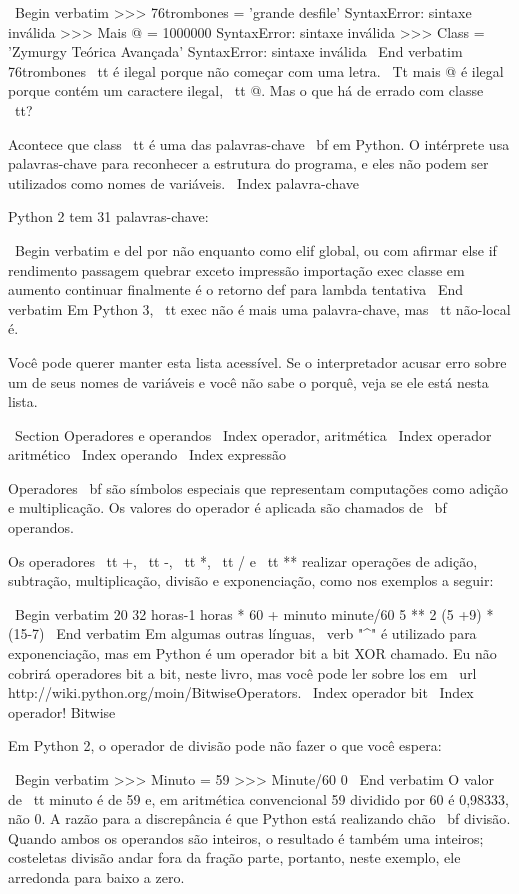 \documentclass[10pt]{book}
\begin{document}
\begin {itemize}
{\ Begin {verbatim}
>>> 76trombones = 'grande desfile'
SyntaxError: sintaxe inválida
>>> Mais @ = 1000000
SyntaxError: sintaxe inválida
>>> Class = 'Zymurgy Teórica Avançada'
SyntaxError: sintaxe inválida
\ End {verbatim}
%
{76trombones \ tt} é ilegal porque não começar com uma letra.
{\ Tt mais @} é ilegal porque contém um caractere ilegal, {\ tt
@}. Mas o que há de errado com classe {\ tt}?

Acontece que {class \ tt} é uma das palavras-chave {\ bf} em Python. O
intérprete usa palavras-chave para reconhecer a estrutura do programa,
e eles não podem ser utilizados como nomes de variáveis.
\ Index {palavra-chave}

Python 2 tem 31 palavras-chave:

\ Begin {verbatim}
e del por não enquanto    
como elif global, ou com     
afirmar else if rendimento passagem    
quebrar exceto impressão importação              
exec classe em aumento              
continuar finalmente é o retorno             
def para lambda tentativa
\ End {verbatim}
%
Em Python 3, {\ tt exec} não é mais uma palavra-chave, mas {\ tt} não-local é.

Você pode querer manter esta lista acessível. Se o interpretador acusar erro
sobre um de seus nomes de variáveis ​​e você não sabe o porquê, veja se ele
está nesta lista.


\ Section {Operadores e operandos}
\ Index {operador, aritmética}
\ Index {operador aritmético}
\ Index {operando}
\ Index {expressão}

{Operadores \ bf} são símbolos especiais que representam computações como
adição e multiplicação. Os valores do operador é aplicada
são chamados de {\ bf operandos}.

Os operadores {\ tt +}, {\ tt -}, {\ tt *}, {\ tt /} e {\ tt **}
realizar operações de adição, subtração, multiplicação, divisão e
exponenciação, como nos exemplos a seguir:

\ Begin {verbatim}
20 32 horas-1 horas * 60 + minuto minute/60 5 ** 2 (5 +9) * (15-7)
\ End {verbatim}
%
Em algumas outras línguas, \ verb "^" é utilizado para exponenciação, mas
em Python é um operador bit a bit XOR chamado. Eu não cobrirá
operadores bit a bit, neste livro, mas você pode ler sobre
los em \ url {http://wiki.python.org/moin/BitwiseOperators}.
\ Index {operador bit}
\ Index {operador! Bitwise}

Em Python 2, o operador de divisão pode não fazer o que você espera:

\ Begin {verbatim}
>>> Minuto = 59
>>> Minute/60
0
\ End {verbatim}
%
O valor de {\ tt minuto} é de 59 e, em aritmética convencional 59
dividido por 60 é 0,98333, não 0. A razão para a discrepância é
que Python está realizando {chão \ bf divisão}.
Quando ambos os operandos são inteiros, o resultado é também uma
inteiros; costeletas divisão andar fora da fração
parte, portanto, neste exemplo, ele arredonda para baixo a zero.

}
\end{itemize}
\end{document}
